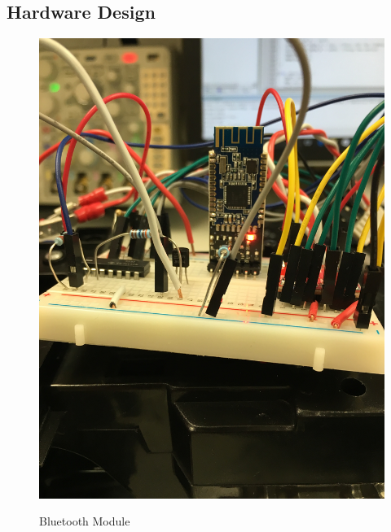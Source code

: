 \documentclass[12pt]{article}
\begin{document}
\subsection{Hardware Design}
\begin{figure}[H]
\begin {center}
\includegraphics[scale=.10]{bluetooth}\\
\caption{Bluetooth Module}
\end {center}
\end{figure}
\end{document}

